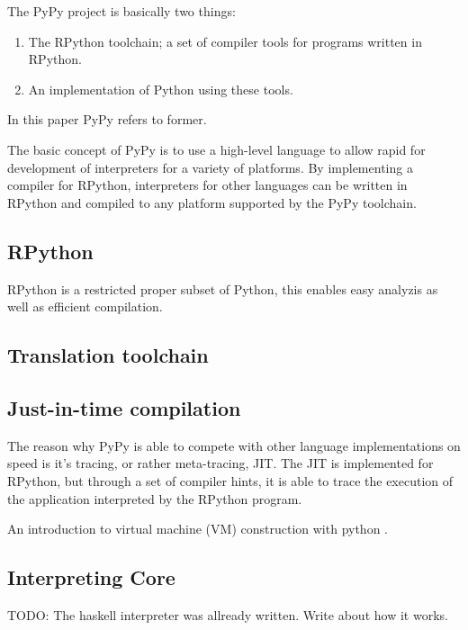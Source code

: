\documentclass{article}
\begin{document}
The PyPy project is basically two things:

\begin{enumerate}

\item The RPython toolchain; a set of compiler tools for programs written in 
RPython.

\item An implementation of Python using these tools.

\end{enumerate}

In this paper PyPy refers to former.

The basic concept of PyPy is to use a high-level language to allow rapid for
development of interpreters for a variety of platforms. By implementing a compiler
for RPython, interpreters for other languages can be written in RPython and 
compiled to any platform supported by the PyPy toolchain.

\subsection{RPython}

RPython is a restricted proper subset of Python, this enables easy analyzis 
as well as efficient compilation.

\subsection{Translation toolchain}


\subsection{Just-in-time compilation}

The reason why PyPy is able to compete with other language implementations
on speed is it's tracing, or rather meta-tracing, JIT. The JIT is implemented
for RPython, but through a set of compiler hints, it is able to trace the 
execution of the application interpreted by the RPython program.

An introduction to virtual machine (VM) construction with python \cite{pypy}.


\subsection{Interpreting Core}

TODO: The haskell interpreter was allready written. Write about how it works.
\end{document}
